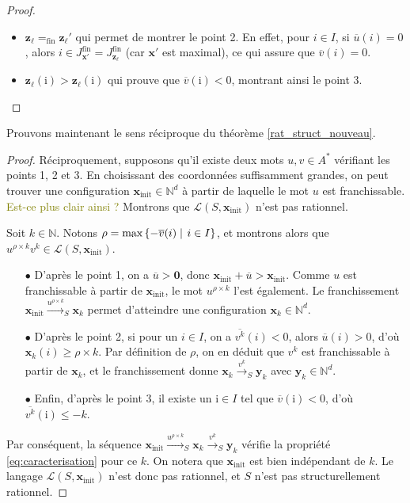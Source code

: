 \documentclass[a4paper,final]{article}
\theoremstyle{definition}
\let\leq\leqslant
\let\geq\geqslant
\newcommand{\lucas}[1]{\textcolor{olive}{#1}}
\newcommand{\set}[2]{\left\{#1\mathrel{\left|\vphantom{#1}\vphantom{#2}\right.}#2\right\}}
\newcommand{\eqfin}{\ensuremath{=_\text{fin}}}
\newcommand{\N}{\ensuremath{\mathbb{N}}}
\newcommand{\lang}{\ensuremath{\mathcal{L}}}
\newcommand{\trans}[2]{\ensuremath{\stackrel{#1}{\longrightarrow}_{#2}}}
\newcommand{\vect}[1]{\ensuremath{\mathbf{#1}}}
\newcommand{\xinit}{\ensuremath{\vect{x}_\text{init}}}
\newcommand{\valeur}[1]{\ensuremath{\overline{#1}}}
\newcommand{\Jfin}[1]{J^\text{fin}_{#1}}
\begin{document}
\begin{proof}
\begin{itemize}
    \item $\vect{z_\ell} \eqfin \vect{z_\ell'}$ qui permet de montrer le point 2.
    En effet, pour $i\in I$, si $\valeur{u}(i) = 0$, alors $i\in\Jfin{\vect{x'}} = \Jfin{\vect{z_\ell}}$ (car $\vect{x'}$ est maximal), ce qui assure que $\valeur{v}(i) = 0$.
    
    \item $\vect{z_\ell}(\mathrm{i}) > \vect{z_\ell}(\mathrm{i})$ qui prouve que $\valeur{v}(\mathrm{i}) < 0$, montrant ainsi le point 3.
\end{itemize}
\end{proof}


Prouvons maintenant le sens réciproque du théorème \ref{rat_struct_nouveau}.

\begin{proof}
Réciproquement, supposons qu'il existe deux mots $u,v\in A^*$ vérifiant les points 1, 2 et 3.
En choisissant des coordonnées suffisamment grandes, on peut trouver une configuration $\xinit \in \N^d$ à partir de laquelle le mot $u$ est franchissable.
\lucas{Est-ce plus clair ainsi ?}
Montrons que $\lang(S,\xinit)$ n'est pas rationnel.

Soit $k\in\N$.
Notons $\rho = \text{max}\set{-\valeur{v}(i)}{i\in I}$, 
et montrons alors que $u^{\rho\times k} v^k \in \lang(S,\xinit)$.

\begin{itemize}
    \item[$\bullet$] D'après le point 1, on a $\valeur{u} > \vect{0}$, donc $\xinit + \valeur{u} > \xinit$.
    Comme $u$ est franchissable à partir de $\xinit$, le mot $u^{\rho\times k}$ l'est également.
    Le franchissement $\xinit \trans{u^{\rho\times k}}{S} \vect{x}_k$ permet d'atteindre une configuration $\vect{x}_k \in\N^d$.
    
    \item[$\bullet$] D'après le point 2, si pour un $i\in I$, on a $\valeur{v^k}(i) < 0$, alors $\valeur{u}(i) > 0$, d'où $\vect{x}_k(i) \geq \rho\times k$.
    Par définition de $\rho$, on en déduit que $v^k$ est franchissable à partir de $\vect{x}_k$, et le franchissement donne $\vect{x}_k \trans{v^k}{S} \vect{y}_k$ avec $\vect{y}_k \in\N^d$.
    
    \item[$\bullet$] Enfin, d'après le point 3, il existe un $\mathrm{i}\in I$ tel que $\valeur{v}(\mathrm{i}) < 0$, d'où $\valeur{v^k}(\mathrm{i}) \leq -k$.
\end{itemize}

Par conséquent, la séquence $\xinit \trans{u^{\rho\times k}}{S} \vect{x}_k \trans{v^k}{S} \vect{y}_k$ vérifie la propriété \eqref{eq:caracterisation} pour ce $k$.
On notera que $\xinit$ est bien indépendant de $k$.
Le langage $\lang(S,\xinit)$ n'est donc pas rationnel, et $S$ n'est pas structurellement rationnel.
\end{proof}
\end{document}
